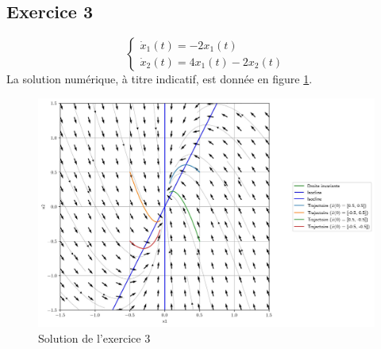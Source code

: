         \subsection{Exercice 3}
            \begin{equation*}
                \begin{cases}
                    \dot{x}_1(t) = -2 x_1(t)\\
                    \dot{x}_2(t) = 4 x_1(t) - 2 x_2(t)
                \end{cases}
            \end{equation*}
            La solution numérique, à titre indicatif, est donnée en figure \ref{fig:conclusif_3}.
            \begin{figure}[ht!]
                \centering
                \includegraphics[width=\textwidth]{images/conclusif_3.jpg}
                \caption{Solution de l'exercice 3}
                \label{fig:conclusif_3}
            \end{figure}